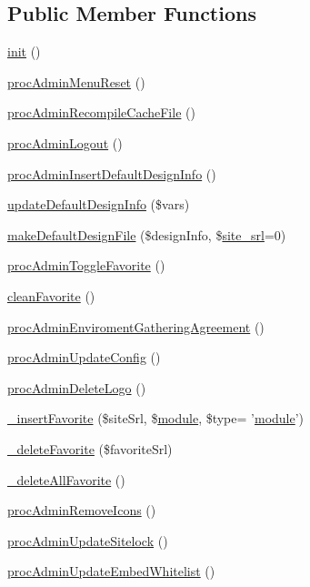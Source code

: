 \subsection*{Public Member Functions}
\begin{DoxyCompactItemize}
\item 
\hyperlink{classadminAdminController_abfceebf69c8870ad40dcb1714a6aae0e}{init} ()
\item 
\hyperlink{classadminAdminController_a0ba2a344a960ba3fa385f8450233cd32}{proc\+Admin\+Menu\+Reset} ()
\item 
\hyperlink{classadminAdminController_a15f6aab1393b491c9f754af46929fee7}{proc\+Admin\+Recompile\+Cache\+File} ()
\item 
\hyperlink{classadminAdminController_af49660a64f4b64c0b2f0801f4742abd1}{proc\+Admin\+Logout} ()
\item 
\hyperlink{classadminAdminController_ab0b62d09b5f73640ab9a7a7c5a58e579}{proc\+Admin\+Insert\+Default\+Design\+Info} ()
\item 
\hyperlink{classadminAdminController_ab0f984cd55d52455a818323404efb974}{update\+Default\+Design\+Info} (\$vars)
\item 
\hyperlink{classadminAdminController_a70c3ce620fc0791bb2acec0a9dedcc74}{make\+Default\+Design\+File} (\$design\+Info, \$\hyperlink{ko_8install_8php_a8b1406b4ad1048041558dce6bfe89004}{site\+\_\+srl}=0)
\item 
\hyperlink{classadminAdminController_ab7075e4e561ebf87b4d06418638d52ab}{proc\+Admin\+Toggle\+Favorite} ()
\item 
\hyperlink{classadminAdminController_a774b7d9260572f5d6391adc624e6b810}{clean\+Favorite} ()
\item 
\hyperlink{classadminAdminController_a8ef62179d5114d3d718846179d907bf0}{proc\+Admin\+Enviroment\+Gathering\+Agreement} ()
\item 
\hyperlink{classadminAdminController_a720735446257b930dce48d07c4ac9e4e}{proc\+Admin\+Update\+Config} ()
\item 
\hyperlink{classadminAdminController_a603a7e8aca1d391d61599b8db4ef2ccb}{proc\+Admin\+Delete\+Logo} ()
\item 
\hyperlink{classadminAdminController_a4d42a0954afb6d20d8f20617f8a5dac6}{\+\_\+insert\+Favorite} (\$site\+Srl, \$\hyperlink{classmodule}{module}, \$type= '\hyperlink{classmodule}{module}')
\item 
\hyperlink{classadminAdminController_aeaf185ff2307ca6fcccaf1589b25bc6f}{\+\_\+delete\+Favorite} (\$favorite\+Srl)
\item 
\hyperlink{classadminAdminController_af03754d231177ae0326f0cc262dd6dd7}{\+\_\+delete\+All\+Favorite} ()
\item 
\hyperlink{classadminAdminController_a9ddaddf87c06a8ef329ddc0d4305f5d1}{proc\+Admin\+Remove\+Icons} ()
\item 
\hyperlink{classadminAdminController_a4bbc5bf3f60f108c82b373b4b6fbf8a1}{proc\+Admin\+Update\+Sitelock} ()
\item 
\hyperlink{classadminAdminController_aff36b4021e19ccb44ab87043faf13b1a}{proc\+Admin\+Update\+Embed\+Whitelist} ()
\end{DoxyCompactItemize}
